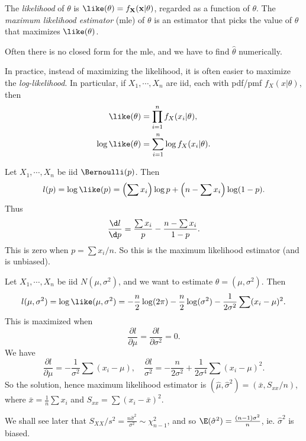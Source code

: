 \documentclass[a4paper]{article}
\begin{document}
\begin{defi}[Likelihood]
  The \emph{likelihood} of $\theta$ is $\like(\theta) = f_\mathbf{X}(\mathbf{x} | \theta)$, regarded as a function of $\theta$. The \emph{maximum likelihood estimator} (mle) of $\theta$ is an estimator that picks the value of $\theta$ that maximizes $\like (\theta)$.
\end{defi}
Often there is no closed form for the mle, and we have to find $\hat{\theta}$ numerically.

In practice, instead of maximizing the likelihood, it is often easier to maximize the \emph{log-likelihood}. In particular, if $X_1, \cdots, X_n$ are iid, each with pdf/pmf $f_X(x|\theta)$, then
\begin{align*}
  \like(\theta) &= \prod_{i = 1}^n f_X(x_i|\theta),\\
  \log\like (\theta) &= \sum_{i = 1}^n \log f_X(x_i|\theta).
\end{align*}

\begin{eg}
  Let $X_1, \cdots, X_n$ be iid $\Bernoulli(p)$. Then
  \[
    l(p) =\log\like(p) = \left(\sum x_i\right)\log p + \left(n - \sum x_i\right)\log(1 - p).
  \]
  Thus
  \[
    \frac{\d l}{\d p} = \frac{\sum x_i}{p} - \frac{n - \sum x_i}{1 - p}.
  \]
  This is zero when $p = \sum x_i /n$. So this is the maximum likelihood estimator (and is unbiased).
\end{eg}

\begin{eg}
  Let $X_1, \cdots, X_n$ be iid $N(\mu, \sigma^2)$, and we want to estimate $\theta = (\mu, \sigma^2)$. Then
  \[
    l(\mu, \sigma^2) = \log\like(\mu, \sigma^2) = -\frac{n}{2}\log (2\pi) - \frac{n}{2}\log (\sigma^2) - \frac{1}{2\sigma^2}\sum (x_i - \mu)^2.
  \]
  This is maximized when
  \[
    \frac{\partial l}{\partial\mu} = \frac{\partial l}{\partial \sigma^2} = 0.
  \]
  We have
  \[
    \frac{\partial l}{\partial \mu} = -\frac{1}{\sigma^2}\sum (x_i - \mu), \quad \frac{\partial l}{\sigma^2} = -\frac{n}{2\sigma^2} + \frac{1}{2\sigma^4}\sum (x_i - \mu)^2.
  \]
  So the solution, hence maximum likelihood estimator is $(\hat{\mu}, \hat{\sigma}^2) = (\bar x, S_{xx}/n)$, where $\bar{x} = \frac{1}{n}\sum x_i$ and $S_{xx} = \sum(x_i - \bar{x})^2$.

  We shall see later that $S_{XX}/s^2 = \frac{n\hat{\sigma}^2}{\sigma^2}\sim \chi_{n - 1}^2$, and so $\E(\hat{\sigma}^2) = \frac{(n - 1)\sigma^2}{n}$, ie. $\hat{\sigma}^2$ is biased.
\end{eg}
\end{document}
